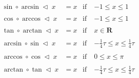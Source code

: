 \begin{equation}
\begin{aligned}
\sin \circ \arcsin \triangleleft \; x &= x & \text{if}\; & -1 \leq x \leq 1 \\
&\\
\cos \circ \arccos \triangleleft \; x &= x & \text{if}\; & -1 \leq x \leq 1 \\
&\\
\tan \circ \arctan \triangleleft \; x &= x & \text{if}\; & x \in \mathbf{R} \\
&\\
\arcsin \circ \sin \triangleleft \; x &= x & \text{if}\; & -\frac{1}{4}\tau \leq x \leq \frac{1}{4}\tau \\
&\\
\arccos \circ \cos \triangleleft \; x &= x & \text{if}\; & 0 \leq x \leq \pi \\
&\\
\arctan \circ \tan \triangleleft \; x &= x & \text{if}\; & -\frac{1}{4}\tau \leq x \leq \frac{1}{4}\tau
\end{aligned}
\end{equation}